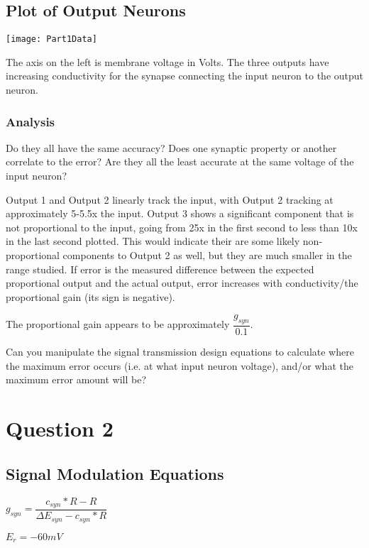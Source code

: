 \documentclass[12pt, letterpaper, oneside, notitlepage, onecolumn]{article}
\begin{document}
\subsection{Plot of Output Neurons}

\texttt{[image: Part1Data]}

The axis on the left is membrane voltage in Volts. The three outputs have increasing conductivity for the synapse connecting the input neuron to the output neuron.

\subsubsection{Analysis}

Do they all have the same accuracy? Does one synaptic property or another
correlate to the error? Are they all the least accurate at the same voltage 
of the input neuron?

Output 1 and Output 2 linearly track the input, with Output 2 tracking at approximately 5-5.5x the input. Output 3 shows a significant component that is not proportional to the input, going from 25x in the first second to less than 10x in the last second plotted. This would indicate their are some likely non-proportional components to Output 2 as well, but they are much smaller in the range studied. If error is the measured difference between the expected proportional output and the actual output, error increases with conductivity/the proportional gain (its sign is negative).

The proportional gain appears to be approximately $\dfrac{g_{syn}}{0.1}$.

Can you manipulate the signal transmission design 
equations to calculate where the maximum error occurs (i.e. at what input 
neuron voltage), and/or what the maximum error amount will be?


\section{Question 2}

\subsection{Signal Modulation Equations}

$g_{syn} = \dfrac{c_{syn} * R - R}{\Delta E_{syn} - c_{syn} * R}$

$E_{r} = -60mV$
\end{document}
